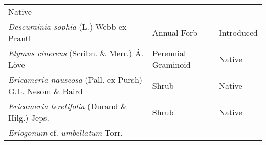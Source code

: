 \documentclass[8pt,]{article}
\begin{document}
\begin{longtable}[]{@{}lll@{}}
\begin{minipage}[t]{0.15\columnwidth}
Native\strut
\end{minipage}\tabularnewline
\begin{minipage}[t]{0.49\columnwidth}\raggedright\strut
\emph{Descurainia sophia} (L.) Webb ex Prantl\strut
\end{minipage} & \begin{minipage}[t]{0.27\columnwidth}\raggedright\strut
Annual Forb\strut
\end{minipage} & \begin{minipage}[t]{0.15\columnwidth}\raggedright\strut
Introduced\strut
\end{minipage}\tabularnewline
\begin{minipage}[t]{0.49\columnwidth}\raggedright\strut
\emph{Elymus cinereus} (Scribn. \& Merr.) Á. Löve\strut
\end{minipage} & \begin{minipage}[t]{0.27\columnwidth}\raggedright\strut
Perennial Graminoid\strut
\end{minipage} & \begin{minipage}[t]{0.15\columnwidth}\raggedright\strut
Native\strut
\end{minipage}\tabularnewline
\begin{minipage}[t]{0.49\columnwidth}\raggedright\strut
\emph{Ericameria nauseosa} (Pall. ex Pursh) G.L. Nesom \& Baird\strut
\end{minipage} & \begin{minipage}[t]{0.27\columnwidth}\raggedright\strut
Shrub\strut
\end{minipage} & \begin{minipage}[t]{0.15\columnwidth}\raggedright\strut
Native\strut
\end{minipage}\tabularnewline
\begin{minipage}[t]{0.49\columnwidth}\raggedright\strut
\emph{Ericameria teretifolia} (Durand \& Hilg.) Jeps.\strut
\end{minipage} & \begin{minipage}[t]{0.27\columnwidth}\raggedright\strut
Shrub\strut
\end{minipage} & \begin{minipage}[t]{0.15\columnwidth}\raggedright\strut
Native\strut
\end{minipage}\tabularnewline
\begin{minipage}[t]{0.49\columnwidth}\raggedright\strut
\emph{Eriogonum} cf. \emph{umbellatum} Torr.\strut
\end{minipage} & \begin{minipage}[t]{0.27\columnwidth}\raggedright\strut

\end{minipage}
\end{longtable}
\end{document}
